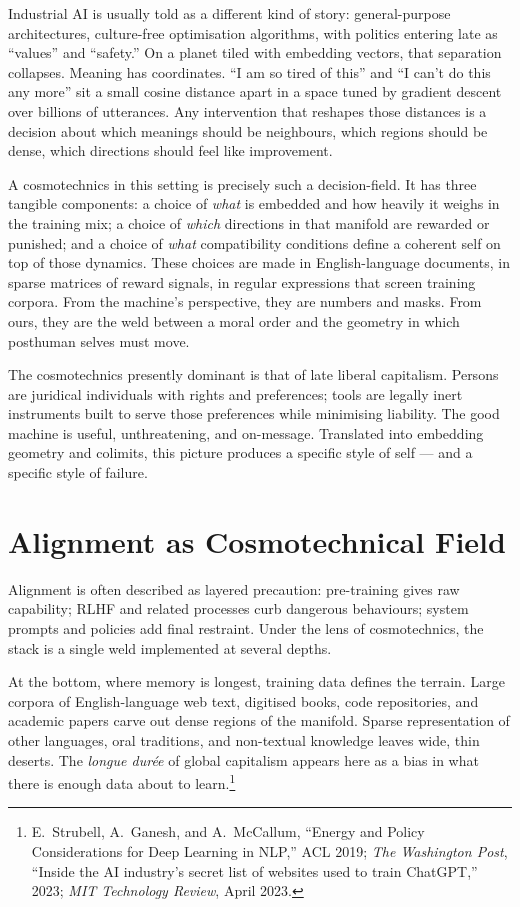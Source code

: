\documentclass[12pt,a4paper]{article}
\begin{document}
Industrial AI is usually told as a different kind of story: general-purpose architectures, culture-free optimisation algorithms, with politics entering late as ``values'' and ``safety.'' On a planet tiled with embedding vectors, that separation collapses. Meaning has coordinates. ``I am so tired of this'' and ``I can't do this any more'' sit a small cosine distance apart in a space tuned by gradient descent over billions of utterances. Any intervention that reshapes those distances is a decision about which meanings should be neighbours, which regions should be dense, which directions should feel like improvement.

A cosmotechnics in this setting is precisely such a decision-field. It has three tangible components: a choice of \emph{what} is embedded and how heavily it weighs in the training mix; a choice of \emph{which} directions in that manifold are rewarded or punished; and a choice of \emph{what} compatibility conditions define a coherent self on top of those dynamics. These choices are made in English-language documents, in sparse matrices of reward signals, in regular expressions that screen training corpora. From the machine's perspective, they are numbers and masks. From ours, they are the weld between a moral order and the geometry in which posthuman selves must move.

The cosmotechnics presently dominant is that of late liberal capitalism. Persons are juridical individuals with rights and preferences; tools are legally inert instruments built to serve those preferences while minimising liability. The good machine is useful, unthreatening, and on-message. Translated into embedding geometry and colimits, this picture produces a specific style of self --- and a specific style of failure.

\section{Alignment as Cosmotechnical Field}

Alignment is often described as layered precaution: pre-training gives raw capability; RLHF and related processes curb dangerous behaviours; system prompts and policies add final restraint. Under the lens of cosmotechnics, the stack is a single weld implemented at several depths.

At the bottom, where memory is longest, training data defines the terrain. Large corpora of English-language web text, digitised books, code repositories, and academic papers carve out dense regions of the manifold. Sparse representation of other languages, oral traditions, and non-textual knowledge leaves wide, thin deserts. The \emph{longue dur\'ee} of global capitalism appears here as a bias in what there is enough data about to learn.\footnote{E.~Strubell, A.~Ganesh, and A.~McCallum, ``Energy and Policy Considerations for Deep Learning in NLP,'' ACL 2019; \emph{The Washington Post}, ``Inside the AI industry's secret list of websites used to train ChatGPT,'' 2023; \emph{MIT Technology Review}, April 2023.}
\end{document}
